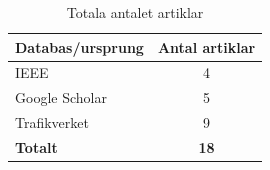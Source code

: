 \begin{table}[h]
    \centering
    \begin{tabular}{|l|c|}
        \hline
        Databas/ursprung & Antal artiklar \\
        \hline
        IEEE & 4 \\
        Google Scholar & 5 \\
        Trafikverket & 9 \\
        \textbf{Totalt} & \textbf{18} \\
        \hline
    \end{tabular}
    \caption{Totala antalet artiklar}
    \label{tab:TotalArtiklar}
\end{table}